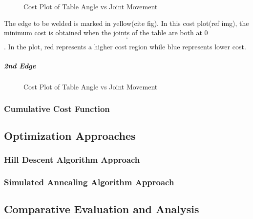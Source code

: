 \begin{figure}[!htbp] %
 \centering
   \caption{Cost Plot of Table Angle vs Joint Movement}
\label{fig:img19}
\end{figure}
The edge to be welded is marked in yellow(cite fig). In this cost plot(ref img), the minimum cost is obtained when the joints of the table are both at 0$$^{\circ}$$. In the plot, red represents a higher cost region while blue represents lower cost.
\subparagraph{2nd Edge}
\begin{figure}[!htbp] %
 \centering
   \caption{Cost Plot of Table Angle vs Joint Movement}
\label{fig:img18}
\end{figure}
\subsubsection{Cumulative Cost Function}
\subsection{Optimization Approaches}
\subsubsection{Hill Descent Algorithm Approach}
\subsubsection{Simulated Annealing Algorithm Approach}
\subsection{Comparative Evaluation and Analysis}
